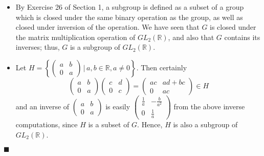 \documentclass[12pt]{article}
\renewcommand{\qed}{\hfill$\blacksquare$}
\renewenvironment{proof}{\begin{addmargin}[1em]{0em}\begin{newproof}}{\end{newproof}\end{addmargin}\qed}
\begin{document}
\begin{proof}
\begin{itemize}
    \item By Exercise 26 of Section 1, a subgroup is defined as a subset of a group which is closed under the same binary operation as the group, as well as closed under inversion of the operation. We have seen that $G$ is closed under the matrix multiplication operation of $GL_2\left(\mathbb{R}\right)$, and also that $G$ contains its inverses; thus, $G$ is a subgroup of $GL_2\left(\mathbb{R}\right)$.
    \item Let $H = \left\{ \left(\begin{array}{cc} a & b \\ 0 & a \end{array}\right) \, | \, a,b\in \mathbb{R}, a\neq 0\right\}$. Then certainly
    $$ \left(\begin{array}{cc} a & b \\ 0 & a \end{array}\right)\left(\begin{array}{cc} c & d \\ 0 & c \end{array}\right)=\left(\begin{array}{cc} ac & ad+bc \\ 0 & ac \end{array}\right) \in H $$
    and an inverse of $\left(\begin{array}{cc} a & b \\ 0 & a \end{array}\right)$ is easily $\left(\begin{array}{cc} \frac{1}{a} & -\frac{b}{a^2} \\ 0 & \frac{1}{a} \end{array}\right)$ from the above inverse computations, since $H$ is a subset of $G$. Hence, $H$ is also a subgroup of $GL_2\left(\mathbb{R}\right)$.
\end{itemize}
\end{proof}
\end{document}
